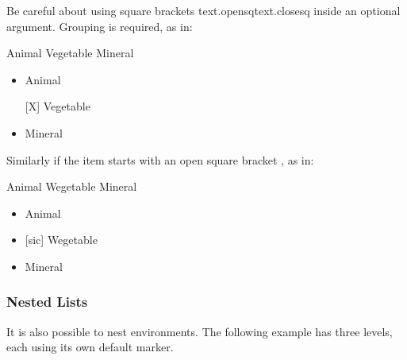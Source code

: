 Be careful about using square brackets
\gls{text.opensq}\gls{text.closesq} inside an optional
argument. Grouping is required, as in:
\begin{code}
\newline
{} Animal\newline
{} Vegetable\newline
{} Mineral\newline
{}
\end{code}%
\begin{result}
\begin{itemize}
\item Animal
\item[{[X]}] Vegetable
\item Mineral
\end{itemize}
\end{result}
Similarly if the item starts with an open square bracket
, as in:
\begin{code}
\newline
{} Animal\newline
{}  Wegetable\newline
{} Mineral\newline
{}
\end{code}
\begin{result}
\begin{itemize}
\item Animal
\item {[sic]} Wegetable
\item Mineral
\end{itemize}
\end{result}

\subsubsection{Nested Lists}
\label{sec:nesteditemise}

It is also possible to nest  environments.
The following example has three levels, each using its own default marker.

